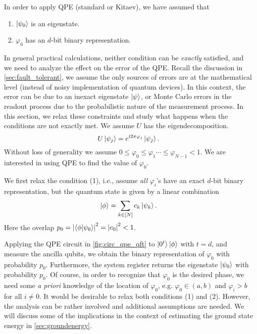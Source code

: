 In order to apply QPE (standard or Kitaev), we have assumed that 
\begin{enumerate}
  \item $\ket{\psi_0}$ is an eigenstate.
  \item $\varphi_0$ has an $d$-bit binary representation.
\end{enumerate}
In general practical calculations, neither condition can be \emph{exactly} satisfied, and we need to analyze the effect on the error of the QPE.
Recall the discussion in \cref{sec:fault_tolerant}, we assume the only sources of errors are at the mathematical level (instead of noisy implementation of quantum devices).
In this context, the error can be due to an inexact eigenstate $\ket{\psi}$, or Monte Carlo errors in the readout process due to the probabilistic nature of the measurement process.
In this section, we relax these constraints and study what happens when the conditions are not exactly met. 
We assume $U$ has the eigendecomposition.
\begin{equation}
U\ket{\psi_j}=e^{\mathrm{i} 2\pi  \varphi_j}\ket{\psi_j}.
\end{equation}
Without loss of generality we assume $0\le \varphi_0\le \varphi_1\cdots \le\varphi_{N-1}<1$. 
We are interested in using QPE to find the value of $\varphi_0$.

We first relax the condition (1), i.e., assume \emph{all} $\varphi_i$'s have an exact $d$-bit binary representation, but the quantum state is given by a linear combination
\begin{equation}
\ket{\phi}=\sum_{k\in[N]} c_k \ket{\psi_k}.
\end{equation}
Here the overlap $p_0=\left\lvert\braket{\phi|\psi_0}\right\rvert^2=\left\lvert c_0\right\rvert^2<1$. 

Applying the QPE circuit in \cref{fig:circ_qpe_qft} to $\ket{0^t}\ket{\phi}$ with $t=d$, and measure the ancilla qubits, we obtain the binary representation of $\varphi_0$ with probability $p_0$. 
Furthermore, the system register returns the eigenstate $\ket{\psi_0}$ with probability $p_0$.
Of course, in order to recognize that $\varphi_0$ is the desired phase, we need some \emph{a priori} knowledge of the location of $\varphi_0$, e.g. $\varphi_0\in(a,b)$ and $\varphi_i>b$ for all $i\ne 0$.
It would be desirable to relax both conditions (1) and (2). 
However, the analysis can be rather involved and additional assumptions are needed. 
We will discuss some of the implications in the context of estimating the ground state energy in \cref{sec:groundenergy}.


